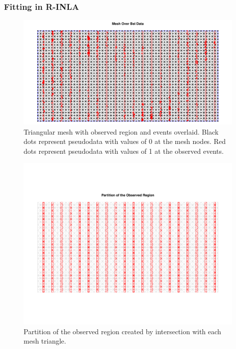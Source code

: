 \documentclass[]{interact}
\begin{document}
\subsubsection{Fitting in R-INLA}
\label{xsectfitting}

\begin{figure}[p]
\includegraphics[width=\textwidth]{figures/bei-effort_mesh.pdf}
\caption{Triangular mesh with observed region and events overlaid. Black dots
represent pseudodata with values of 0 at the mesh nodes. Red dots represent
pseudodata with values of 1 at the observed events.}
\label{effortmesh}
\end{figure}

\begin{figure}[p]
\includegraphics[width=\textwidth]{figures/bei-effort_partition.pdf}
\caption{Partition of the observed region created by intersection with each
mesh triangle.}
\label{effortpartition}
\end{figure}
\end{document}

